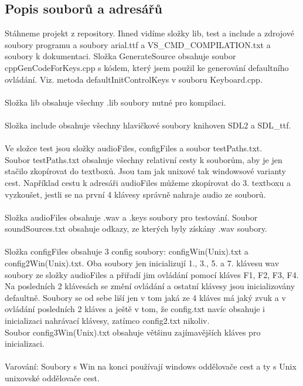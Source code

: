 \documentclass[12pt]{article}
\begin{document}
	\subsection{Popis souborů a adresářů}
	Stáhneme projekt z repository. Ihned vidíme složky lib, test a include a zdrojové soubory programu a soubory arial.ttf a VS\_CMD\_COMPILATION.txt a soubory k dokumentaci. Složka GenerateSource obsahuje soubor cppGenCodeForKeys.cpp s kódem, který jsem použil ke generování defaultního ovládání. Viz. metoda defaultInitControlKeys v souboru Keyboard.cpp.
	\\
	\\
	Složka lib obsahuje všechny .lib soubory nutné pro kompilaci.
	\\
	\\
	Složka include obsahuje všechny hlavičkové soubory knihoven SDL2 a SDL\_ttf.
	\\
	\\
	Ve složce test jsou složky audioFiles, configFiles a soubor testPaths.txt.
	\\
	Soubor testPaths.txt obsahuje všechny relativní cesty k souborům, aby je jen stačilo zkopírovat do textboxů. Jsou tam jak unixové tak windowsové varianty cest. Například cestu k adresáři audioFiles můžeme zkopírovat do 3. textboxu a vyzkoušet, jestli se na první 4 klávesy správně nahraje audio ze souborů.
	\\
	\\
	Složka audioFiles obsahuje .wav a .keys soubory pro testování. Soubor soundSources.txt obsahuje odkazy, ze kterých byly získány .wav soubory.
	\\
	\\
	Složka configFiles obsahuje 3 config soubory: configWin(Unix).txt a config2Win(Unix).txt. Oba soubory jen inicializují 1., 3., 5. a 7. klávesu wav soubory ze složky audioFiles a přiřadí jim ovládání pomocí kláves F1, F2, F3, F4. Na posledních 2 klávesách se změní ovládání a ostatní klávesy jsou inicializovány defaultně. Soubory se od sebe liší jen v tom jaká ze 4 kláves má jaký zvuk a v ovládání posledních 2 kláves a ještě v tom, že config.txt navíc obsahuje i inicializaci nahrávací klávesy, zatímco config2.txt nikoliv.
	\\
	Soubor config3Win(Unix).txt obsahuje většinu zajímavějších kláves pro inicializaci.
	\\
	\\
	Varování: Soubory s Win na konci používají windows oddělovače cest a ty s Unix unixovské oddělovače cest.
	
	\newpage
\end{document}
